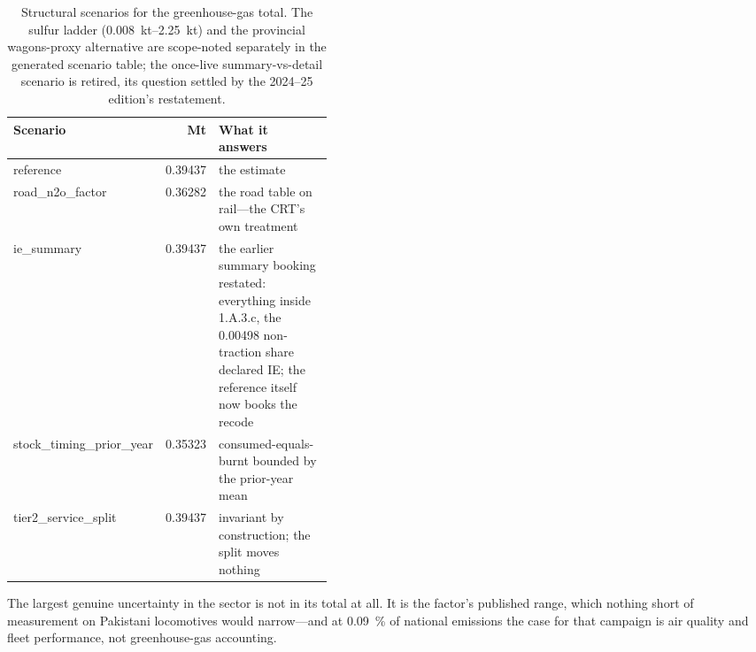 \begin{table}[htbp]
\centering
\footnotesize
\begin{tabular}{@{}lrp{0.42\linewidth}@{}}
\toprule
\textbf{Scenario} & \textbf{Mt \COe{}} & \textbf{What it answers} \\
\midrule
reference                     & 0.39437 & the estimate \\
road\_n2o\_factor             & 0.36282 & the road table on rail---the CRT's own treatment \\
ie\_summary                   & 0.39437 & the earlier summary booking restated: everything
                                          inside 1.A.3.c, the 0.00498 non-traction
                                          share declared IE; the reference itself now
                                          books the recode \\
stock\_timing\_prior\_year    & 0.35323 & consumed-equals-burnt bounded by the prior-year mean \\
tier2\_service\_split         & 0.39437 & invariant by construction; the split moves nothing \\
\bottomrule
\end{tabular}
\caption{Structural scenarios for the greenhouse-gas total. The \SOtwo{} sulfur ladder
(\SIrange{0.008}{2.25}{\kilo\tonne}) and the provincial wagons-proxy alternative are
scope-noted separately in the generated scenario table; the once-live summary-vs-detail
scenario is retired, its question settled by the 2024--25 edition's restatement.}
\label{tab:scenarios}
\end{table}

The largest genuine uncertainty in the sector is not in its total at all. It is the
\NtwoO{} factor's published range, which nothing short of measurement on Pakistani
locomotives would narrow---and at \SI{0.09}{\percent} of national emissions the case for
that campaign is air quality and fleet performance, not greenhouse-gas accounting.
